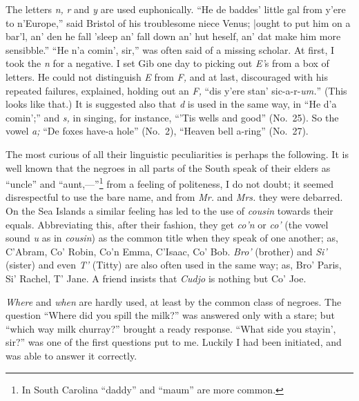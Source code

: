 \documentclass[a5paper,10pt]{book}
\begin{document}
The letters \emph{n,} \emph{r} and \emph{y} are used euphonically.
``He de baddes' little gal from y'ere to n'Europe,'' said Bristol of
his troublesome niece Venus; |ought to put him on a bar'l, an' den he
fall 'sleep an' fall down an' hut heself, an' dat make him more
sensibble.''  ``He n'a comin', sir,'' was often said of a missing
scholar.  At first, I took the \emph{n} for a negative.  I set Gib one
day to picking out \emph{E'}s from a box of letters.  He could not
distinguish \emph{E} from \emph{F,} and at last, discouraged with his
repeated failures, explained, holding out an \emph{F,} ``dis y'ere
stan' sic-a-r-\emph{um.}''  (This looks like that.)  It is suggested
also that \emph{d} is used in the same way, in ``He d'a comin';'' and
\emph{s,} in singing, for instance, ``'Tis wells and good'' (No.~25).
So the vowel \emph{a;} ``De foxes have-a hole'' (No.~2), ``Heaven bell
a-ring'' (No.~27).

The most curious of all their linguistic peculiarities is perhaps the
following.  It is well known that the negroes in all parts of the
South speak of their elders as ``uncle'' and ``aunt,---''\footnote{In
South Carolina ``daddy'' and ``maum'' are more common.} from a feeling
of politeness, I do not doubt; it seemed disrespectful to use the bare
name, and from \emph{Mr.} and \emph{Mrs.} they were debarred.  On the
Sea Islands a similar feeling has led to the use of \emph{cousin}
towards their equals.  Abbreviating this, after their fashion, they
get \emph{co'n} or \emph{co'} (the vowel sound \emph{u} as in
\emph{cousin}) as the common title when they speak of one another; as,
C'Abram, Co' Robin, Co'n Emma, C'Isaac, Co' Bob.  \emph{Bro'}
(brother) and \emph{Si'} (sister) and even \emph{T'} (Titty) are also
often used in the same way; as, Bro' Paris, Si' Rachel, T' Jane.  A
friend insists that \emph{Cudjo} is nothing but Co' Joe.

\emph{Where} and \emph{when} are hardly used, at least by the common
class of negroes.  The question ``Where did you spill the milk?'' was
answered only with a stare; but ``which way milk churray?'' brought a
ready response.  ``What side you stayin', sir?'' was one of the first
questions put to me.  Luckily I had been initiated, and was able to
answer it correctly.
\end{document}

